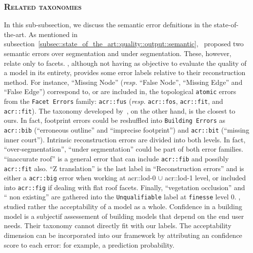         \subsubsection{\textsc{Related taxonomies}}
            In this sub-subsection, we discuss the semantic error defnitions in the state-of-the-art.
            As mentioned in subsection~\ref{subsec::state_of_the_art::quality::output::semantic},~\textcite{rottensteiner2012isprs} proposed two semantic errors over segmentation and under segmentation.
            These, however, relate only to facets.
            \textcite{xiong2014graph}, although not having as objective to evaluate the quality of a model in its entirety, provides some error labels relative to their reconstruction method.
            For instance, ``Missing Node'' (\textit{resp.} ``False Node'', ``Missing Edge'' and ``False Edge'') correspond to, or are included in, the topological \texttt{atomic} errors from the \texttt{Facet Errors} family: \texttt{\gls{acr::fus}} (\textit{resp.} \texttt{\gls{acr::fos}}, \texttt{\gls{acr::fit}}, and \texttt{\gls{acr::fit}}).
            The taxonomy developed by~\textcite{michelin2013quality}, on the other hand, is the closest to ours.
            In fact, footprint errors could be reshuffled into \texttt{Building Errors} as \texttt{\gls{acr::bib}} (``erroneous outline'' and ``imprecise footprint'') and \texttt{\gls{acr::bit}} (``missing inner court'').
            Intrinsic reconstruction errors are divided into both levels.
            In fact, ``over-segmentation'', ``under segmentation'' could be part of both error families.
            ``inaccurate roof'' is a general error that can include \texttt{\gls{acr::fib}} and possibly \texttt{\gls{acr::fit}} also.
            ``Z translation'' is the last label in ``Reconstruction errors'' and is either a \texttt{\gls{acr::big}} error when working at \gls{acr::lod}-0 $\cup$ \gls{acr::lod}-1 level, or included into \texttt{\gls{acr::fig}} if dealing with flat roof facets.
            Finally, ``vegetation occlusion'' and `` non existing'' are gathered into the \texttt{Unqualifiable} label at \texttt{finesse} level 0.
            \textcite{boudet2006supervised}, studied rather the acceptability of a model as a whole.
            Confidence in a building model is a subjectif assessement of building models that depend on the end user needs.
            Their taxonomy cannot directly fit with our labels.
            The acceptability dimension can be incorporated into our framework by attributing an confidence score to each error: for example, a prediction probability.        

